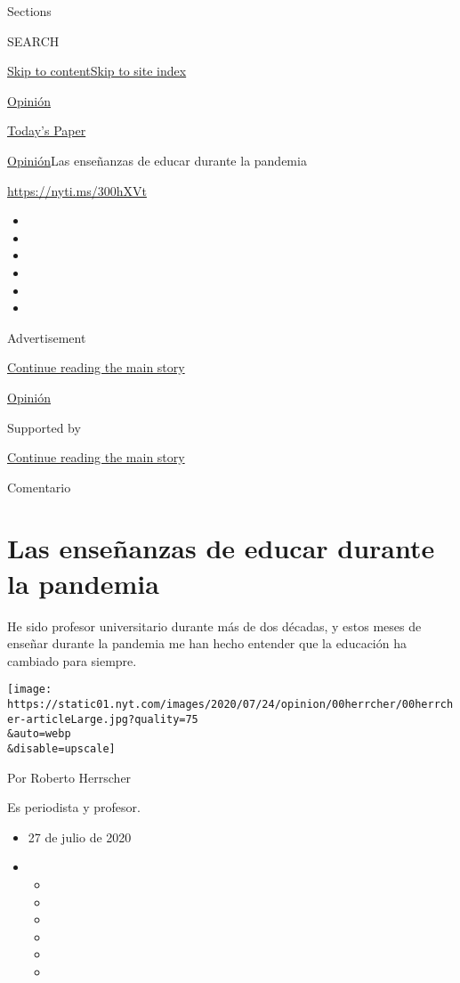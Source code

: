 Sections

SEARCH

\protect\hyperlink{site-content}{Skip to
content}\protect\hyperlink{site-index}{Skip to site index}

\href{https://www.nytimes.com/es/section/opinion}{Opinión}

\href{https://myaccount.nytimes.com/auth/login?response_type=cookie\&client_id=vi}{}

\href{https://www.nytimes.com/section/todayspaper}{Today's Paper}

\href{/es/section/opinion}{Opinión}\textbar{}Las enseñanzas de educar
durante la pandemia

\url{https://nyti.ms/300hXVt}

\begin{itemize}
\item
\item
\item
\item
\item
\item
\end{itemize}

Advertisement

\protect\hyperlink{after-top}{Continue reading the main story}

\href{/es/section/opinion}{Opinión}

Supported by

\protect\hyperlink{after-sponsor}{Continue reading the main story}

Comentario

\hypertarget{las-enseuxf1anzas-de-educar-durante-la-pandemia}{%
\section{Las enseñanzas de educar durante la
pandemia}\label{las-enseuxf1anzas-de-educar-durante-la-pandemia}}

He sido profesor universitario durante más de dos décadas, y estos meses
de enseñar durante la pandemia me han hecho entender que la educación ha
cambiado para siempre.

\texttt{[image: https://static01.nyt.com/images/2020/07/24/opinion/00herrcher/00herrcher-articleLarge.jpg?quality=75\\\&auto=webp\\\&disable=upscale]}

Por Roberto Herrscher

Es periodista y profesor.

\begin{itemize}
\item
  27 de julio de 2020
\item
  \begin{itemize}
  \item
  \item
  \item
  \item
  \item
  \item
  \end{itemize}
\end{itemize}

